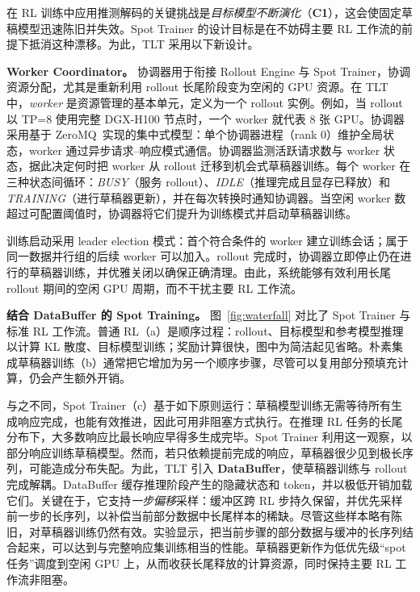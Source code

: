 \documentclass[10pt,twocolumn]{article}
\newcommand{\SysName}{\textrm{TLT}\xspace}
\begin{document}
在 RL 训练中应用推测解码的关键挑战是\emph{目标模型不断演化}（\textbf{C1}），这会使固定草稿模型迅速陈旧并失效。Spot Trainer 的设计目标是在不妨碍主要 RL 工作流的前提下抵消这种漂移。为此，\SysName 采用以下新设计。

\noindent\textbf{Worker Coordinator。}
协调器用于衔接 Rollout Engine 与 Spot Trainer，协调资源分配，尤其是重新利用 rollout 长尾阶段变为空闲的 GPU 资源。在 \SysName 中，\emph{worker} 是资源管理的基本单元，定义为一个 rollout 实例。例如，当 rollout 以 TP=8 使用完整 DGX-H100 节点时，一个 worker 就代表 8 张 GPU。协调器采用基于 ZeroMQ~\cite{ZeroMQ}实现的集中式模型：单个协调器进程（rank 0）维护全局状态，worker 通过异步请求--响应模式通信。协调器监测活跃请求数与 worker 状态，据此决定何时把 worker 从 rollout 迁移到机会式草稿器训练。每个 worker 在三种状态间循环：\emph{BUSY}（服务 rollout）、\emph{IDLE}（推理完成且显存已释放）和\emph{TRAINING}（进行草稿器更新），并在每次转换时通知协调器。当空闲 worker 数超过可配置阈值时，协调器将它们提升为训练模式并启动草稿器训练。

训练启动采用 leader election 模式：首个符合条件的 worker 建立训练会话；属于同一数据并行组的后续 worker 可以加入。rollout 完成时，协调器立即停止仍在进行的草稿器训练，并优雅关闭以确保正确清理。由此，系统能够有效利用长尾 rollout 期间的空闲 GPU 周期，而不干扰主要 RL 工作流。

\noindent\textbf{结合 DataBuffer 的 Spot Training。}
图~\ref{fig:waterfall} 对比了 Spot Trainer 与标准 RL 工作流。普通 RL（a）是顺序过程：rollout、目标模型和参考模型推理以计算 KL 散度、目标模型训练；奖励计算很快，图中为简洁起见省略。朴素集成草稿器训练（b）通常把它增加为另一个顺序步骤，尽管可以复用部分预填充计算，仍会产生额外开销。

与之不同，Spot Trainer（c）基于如下原则运行：草稿模型训练无需等待所有生成响应完成，也能有效推进，因此可用非阻塞方式执行。在推理 RL 任务的长尾分布下，大多数响应比最长响应早得多生成完毕。Spot Trainer 利用这一观察，以部分响应训练草稿模型。然而，若只依赖提前完成的响应，草稿器很少见到极长序列，可能造成分布失配。为此，\SysName 引入 \textbf{DataBuffer}，使草稿器训练与 rollout 完成解耦。DataBuffer 缓存推理阶段产生的隐藏状态和 token，并以极低开销加载它们。关键在于，它支持\emph{一步偏移}采样：缓冲区跨 RL 步持久保留，并优先采样前一步的长序列，以补偿当前部分数据中长尾样本的稀缺。尽管这些样本略有陈旧，对草稿器训练仍然有效。实验显示，把当前步骤的部分数据与缓冲的长序列结合起来，可以达到与完整响应集训练相当的性能。草稿器更新作为低优先级“spot 任务”调度到空闲 GPU 上，从而收获长尾释放的计算资源，同时保持主要 RL 工作流非阻塞。
\end{document}
